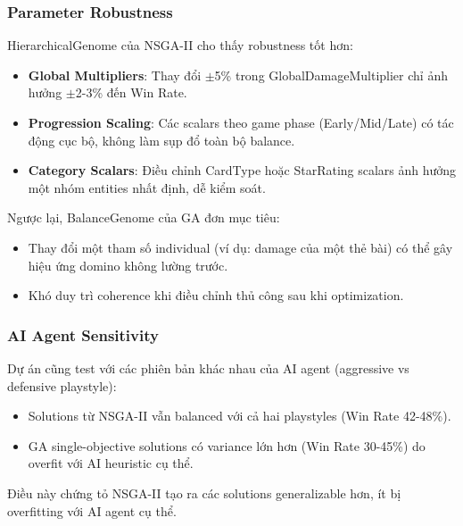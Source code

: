 \subsubsection{Parameter Robustness}
HierarchicalGenome của NSGA-II cho thấy robustness tốt hơn:
\begin{itemize}
    \item \textbf{Global Multipliers}: Thay đổi $\pm$5\% trong GlobalDamageMultiplier chỉ ảnh hưởng $\pm$2-3\% đến Win Rate.
    \item \textbf{Progression Scaling}: Các scalars theo game phase (Early/Mid/Late) có tác động cục bộ, không làm sụp đổ toàn bộ balance.
    \item \textbf{Category Scalars}: Điều chỉnh CardType hoặc StarRating scalars ảnh hưởng một nhóm entities nhất định, dễ kiểm soát.
\end{itemize}

Ngược lại, BalanceGenome của GA đơn mục tiêu:
\begin{itemize}
    \item Thay đổi một tham số individual (ví dụ: damage của một thẻ bài) có thể gây hiệu ứng domino không lường trước.
    \item Khó duy trì coherence khi điều chỉnh thủ công sau khi optimization.
\end{itemize}

\subsubsection{AI Agent Sensitivity}
Dự án cũng test với các phiên bản khác nhau của AI agent (aggressive vs defensive playstyle):
\begin{itemize}
    \item Solutions từ NSGA-II vẫn balanced với cả hai playstyles (Win Rate 42-48\%).
    \item GA single-objective solutions có variance lớn hơn (Win Rate 30-45\%) do overfit với AI heuristic cụ thể.
\end{itemize}

Điều này chứng tỏ NSGA-II tạo ra các solutions generalizable hơn, ít bị overfitting với AI agent cụ thể.